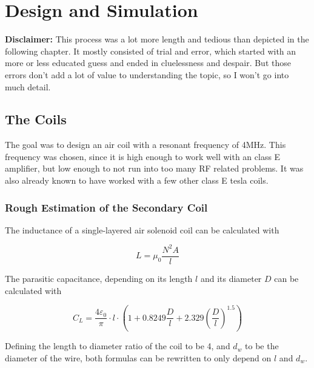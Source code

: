 \setchapterpreamble[u]{\margintoc}

\chapter{Design and Simulation} %

\textbf{Disclaimer:} This process was a lot more length and tedious than depicted in the following chapter. It mostly consisted of trial and error, which started with an more or less educated guess and ended in cluelessness and despair. But those errors don't add a lot of value to understanding the topic, so I won't go into much detail.

\section{The Coils}

The goal was to design an air coil with a resonant frequency of 4MHz. This frequency was chosen, since it is high enough to work well with an class E amplifier, but low enough to not run into too many RF related problems. It was also already known to have worked with a few other class E tesla coils.

\subsection{Rough Estimation of the Secondary Coil}

The inductance of a single-layered air solenoid coil can be calculated with

\begin{equation}\label{eq-inductivity}
    L = \mu_0 \frac{N^2 A}{l}
\end{equation}

The parasitic capacitance, depending on its length \(l\) and its diameter \(D\) can be calculated with

\begin{equation}\label{eq-parasitic-capacitance}
    C_L = \frac{4\varepsilon_0}{\pi} \cdot l \cdot \left( 1 + 0.8249 \frac{D}{l} + 2.329 \left(\frac{D}{l}\right)^{1.5}\right)
\end{equation}

Defining the length to diameter ratio of the coil to be 4, and \(d_w\) to be the diameter of the wire, both formulas can be rewritten to only depend on \(l\) and \(d_w\). 

